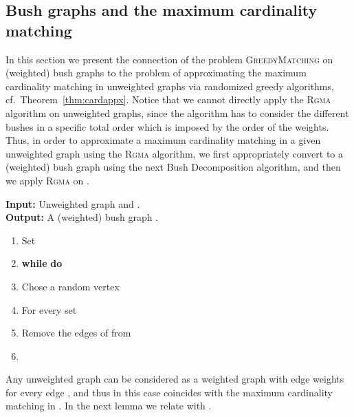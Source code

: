 \documentclass[a4paper,11pt]{article}
\newcommand{\greedy}{\textsc{GreedyMatching}\xspace}
\newcommand{\rgma}{\textsc{Rgma}\xspace}
\begin{document}
\subsection{Bush graphs and the maximum cardinality matching\label{bush-cardinality}}

In this section we present the connection of the problem \greedy on (weighted) bush graphs 
to the problem of approximating the maximum cardinality matching in unweighted graphs via randomized greedy algorithms, cf.~Theorem~\ref{thm:cardappx}. 
Notice that we cannot directly apply the \rgma algorithm on unweighted graphs, 
since the algorithm has to consider the different bushes in a specific total 
order which is imposed by the order of the weights. 
Thus, in order to approximate a maximum cardinality matching in a given unweighted graph  using the \rgma algorithm, 
we first appropriately convert  to a (weighted) bush graph  using the next Bush Decomposition algorithm, and then we apply \rgma on . 


\medskip

\begin{tcolorbox}[title= Bush Decomposition]
\textbf{Input:} Unweighted graph  and .\\
\textbf{Output:} A (weighted) bush graph .\vspace{-2mm}
\begin{enumerate}
\item Set 
\vspace{-2mm}
\item \textbf{while}  \textbf{do}
\vspace{-2mm}
\item \hspace*{2mm} Chose a random vertex  \label{gws3}
\vspace{-2mm}
\item \hspace*{2mm} For every  set 
\vspace{-2mm}
\item \hspace*{2mm} Remove the edges of  from 
\vspace{-2mm}
\item \hspace*{2mm} 
\end{enumerate}
\end{tcolorbox}

\medskip

Any unweighted graph  can be considered as a weighted graph with edge weights  for every edge , 
and thus in this case  coincides with the maximum cardinality matching in .
In the next lemma we relate  with .
\end{document}
